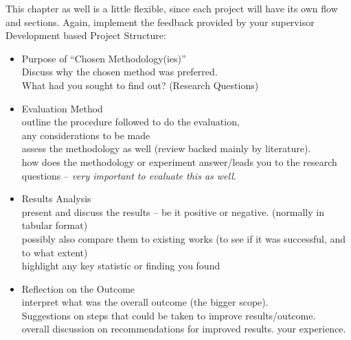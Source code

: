 This chapter as well is a little flexible, since each project will have its own flow and sections.
Again, implement the feedback provided by your supervisor \\

Development based Project Structure:
\begin{itemize}
    \item Purpose of “Chosen Methodology(ies)” \\
Discuss why the chosen method was preferred.\\
What had you sought to find out? (Research Questions)

    \item Evaluation Method \\
outline the procedure followed to do the evaluation,\\
any considerations to be made\\
assess the methodology as well (review backed mainly by literature).\\
how does the methodology or experiment answer/leads you to the research questions – \textit{very important to evaluate this as well}.

    \item Results Analysis \\
present and discuss the results – be it positive or negative. (normally in tabular format)\\
possibly also compare them to existing works (to see if it was successful, and to what extent)\\
highlight any key statistic or finding you found


    \item Reflection on the Outcome \\
interpret what was the overall outcome (the bigger scope).\\
Suggestions on steps that could be taken to improve results/outcome.\\
overall discussion on recommendations for improved results. your experience.

\end{itemize}

\vspace{2em}

